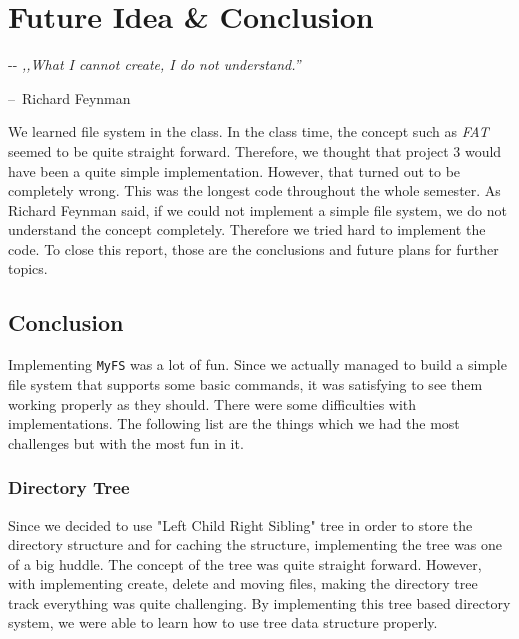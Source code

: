 \documentclass{homework}
\makeatletter
\newenvironment{chapquote}[3][2.7em]
  {\setlength{\@tempdima}{#1}
   \ifx\relax#2\relax\setlength{\@tempdimb}{#1}\else\setlength{\@tempdimb}{#2}\fi
   \def\chapquote@author{#3}
   \parshape 1 \@tempdima \dimexpr\textwidth-\@tempdima-\@tempdimb\relax
   \itshape}
  {\newline\par\normalfont\hfill--\ \chapquote@author\hspace*{\@tempdimb}\par\bigskip}
\makeatother
\begin{document}
\section{Future Idea \& Conclusion}
\begin{chapquote}{}
          {Richard Feynman}
          ,,What I cannot create, I do not understand.''
\end{chapquote}
We learned file system in the class. In the class time, the concept such as \textit{FAT} seemed to be quite straight forward. Therefore, we thought that project 3 would have been a quite simple implementation. However, that turned out to be completely wrong. This was the longest code throughout the whole semester. As Richard Feynman said, if we could not implement a simple file system, we do not understand the concept completely. Therefore we tried hard to implement the code. To close this report, those are the conclusions and future plans for further topics.
\subsection{Conclusion}
Implementing \texttt{MyFS} was a lot of fun. Since we actually managed to build a simple file system that supports some basic commands, it was satisfying to see them working properly as they should. There were some difficulties with implementations. The following list are the things which we had the most challenges but with the most fun in it.
\subsubsection{Directory Tree}
Since we decided to use "Left Child Right Sibling" tree in order to store the directory structure and for caching the structure, implementing the tree was one of a big huddle. The concept of the tree was quite straight forward. However, with implementing create, delete and moving files, making the directory tree track everything was quite challenging. By implementing this tree based directory system, we were able to learn how to use tree data structure properly.
\end{document}
